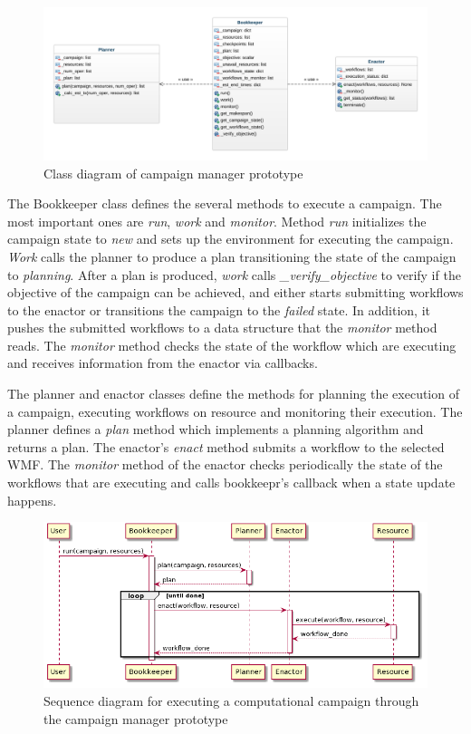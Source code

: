 \begin{figure}[t]
    \centering
    \includegraphics[width=.95\textwidth]{figures/manager/class_diagram.png}
    \caption{Class diagram of campaign manager prototype}\label{fig:rcm_class_diagram}
\end{figure}

The Bookkeeper class defines the several methods to execute a campaign.
The most important ones are \textit{run}, \textit{work} and \textit{monitor}.
Method \textit{run} initializes the campaign state to \textit{new} and sets up the environment for executing the campaign.
\textit{Work} calls the planner to produce a plan transitioning the state of the campaign to \textit{planning}.
After a plan is produced, \textit{work} calls \textit{\_verify\_objective} to verify if the objective of the campaign can be achieved, and either starts submitting workflows to the enactor or transitions the campaign to the \textit{failed} state.
In addition, it pushes the submitted workflows to a data structure that the \textit{monitor} method reads.
The \textit{monitor} method checks the state of the workflow which are executing and receives information from the enactor via callbacks.

The planner and enactor classes define the methods for planning the execution of a campaign, executing workflows on resource and monitoring their execution.
The planner defines a \textit{plan} method which implements a planning algorithm and returns a plan.
The enactor's \textit{enact} method submits a workflow to the selected WMF.
The \textit{monitor} method of the enactor checks periodically the state of the workflows that are executing and calls bookkeepr's callback when a state update happens.

\begin{figure}[t]
    \centering
    \includegraphics[width=.85\textwidth]{figures/manager/rcm_seq.png}
    \caption{Sequence diagram for executing a computational campaign through the campaign manager prototype}
    \label{fig:seq_diag}
\end{figure}

